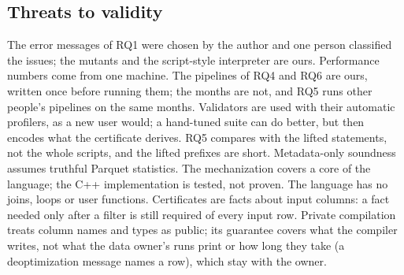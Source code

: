 \subsection{Threats to validity}

The error messages of RQ1 were chosen by the author and one person classified the issues; the
mutants and the script-style interpreter are ours. Performance numbers come from one machine. The
pipelines of RQ4 and RQ6 are ours, written once before running them; the months are not, and RQ5 runs
other people's pipelines on the same months. Validators are
used with their automatic profilers, as a new user would; a hand-tuned suite can do better, but then
encodes what the certificate derives. RQ5 compares with the lifted statements, not the whole scripts,
and the lifted prefixes are short. Metadata-only soundness assumes truthful Parquet statistics. The
mechanization covers a core of the language; the C++ implementation is tested, not proven. The language has
no joins, loops or user functions. Certificates are facts about input columns: a fact needed only
after a filter is still required of every input row. Private compilation treats column names and types
as public; its guarantee covers what the compiler writes, not what the data owner's runs print or how
long they take (a deoptimization message names a row), which stay with the owner.
